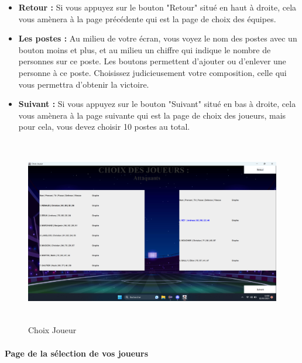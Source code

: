 \begin{itemize}
    \item \textbf{Retour :} 
        Si vous appuyez sur le bouton "Retour" situé en haut à droite, cela vous amènera à la page précédente qui est la page de choix des équipes.

    \vspace{15pt}

    \item \textbf{Les postes :} 
        Au milieu de votre écran, vous voyez le nom des postes avec un bouton moins et plus, et au milieu un chiffre qui indique le nombre de personnes sur ce poste. Les boutons permettent d'ajouter ou d'enlever une personne à ce poste. Choisissez judicieusement votre composition, celle qui vous permettra d'obtenir la victoire.

    \vspace{15pt}

    \item \textbf{Suivant :} 
        Si vous appuyez sur le bouton "Suivant" situé en bas à droite, cela vous amènera à la page suivante qui est la page de choix des joueurs, mais pour cela, vous devez choisir 10 postes au total.
        
    \vspace{15pt}
\end{itemize}

\begin{figure}[h]
\centering
\includegraphics[width=12.82cm, height=8.2cm]{images/ChoixJoueur.png}
\caption{Choix Joueur}
\label{fig:choixJoueur}
\end{figure}

    \vspace{15pt}

\paragraph{Page de la sélection de vos joueurs}

